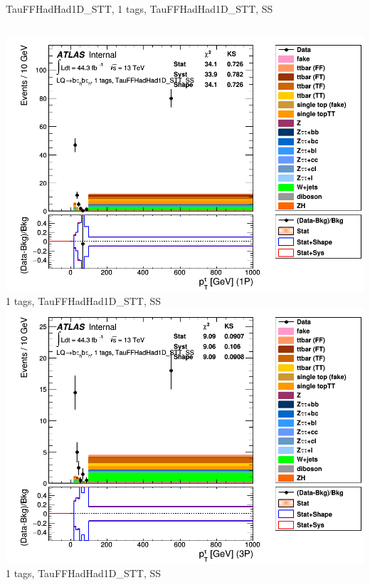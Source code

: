 \begin{frame}{TauFFHadHad1D\_STT, 1 tags, TauFFHadHad1D\_STT, SS}
  \begin{columns}[c]
    \centering\includegraphics[width=\textwidth]{C_1tag2pjet_0ptv_SS_TauPt1P}\\
    1 tags, TauFFHadHad1D\_STT, SS
    \centering\includegraphics[width=\textwidth]{C_1tag2pjet_0ptv_SS_TauPt3P}\\
    1 tags, TauFFHadHad1D\_STT, SS
  \end{columns}
  \begin{columns}[c]

\end{columns}
\end{frame}
